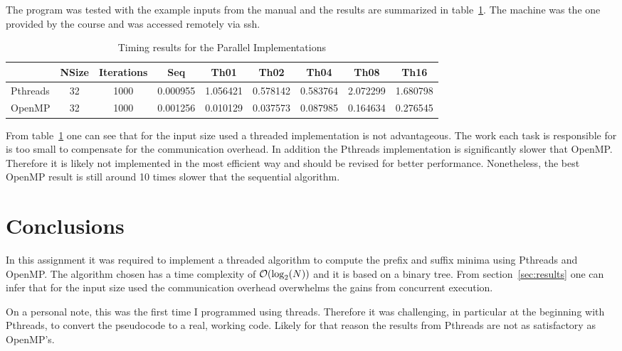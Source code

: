The program was tested with the example inputs from the manual and the results are summarized in table~\ref{tbl:results}. The machine was the one provided by the course and was accessed remotely via ssh.

\begin{table}[H]
\centering
\begin{tabular}{lcccccccc}
         & NSize & Iterations & Seq      & Th01      & Th02      & Th04      & Th08      & Th16
\\\midrule
Pthreads & 32    &     1000   & 0.000955 &  1.056421 &  0.578142 &  0.583764 &  2.072299 &  1.680798\\
OpenMP   & 32    &     1000   & 0.001256 &  0.010129 &  0.037573 &  0.087985 &  0.164634 &  0.276545
\end{tabular}
\caption{Timing results for the Parallel Implementations}
\label{tbl:results}
\end{table}

From table~\ref{tbl:results} one can see that for the input size used a threaded implementation is not advantageous. The work each task is responsible for is too small to compensate for the communication overhead. In addition the Pthreads implementation is significantly slower that OpenMP. Therefore it is likely not implemented in the most efficient way and should be revised for better performance. Nonetheless, the best OpenMP result is still around 10 times slower that the sequential algorithm.

\section{Conclusions}

In this assignment it was required to implement a threaded algorithm to compute the prefix and suffix minima using Pthreads and OpenMP.
The algorithm chosen has a time complexity of $\mathcal{O}(\log_2(N))$ and it is based on a binary tree.
From section~\ref{sec:results} one can infer that for the input size used the communication overhead overwhelms the gains from concurrent execution.

On a personal note, this was the first time I programmed using threads. Therefore it was challenging, in particular at the beginning with Pthreads, to convert the pseudocode to a real, working code. Likely for that reason the results from Pthreads are not as satisfactory as OpenMP's.